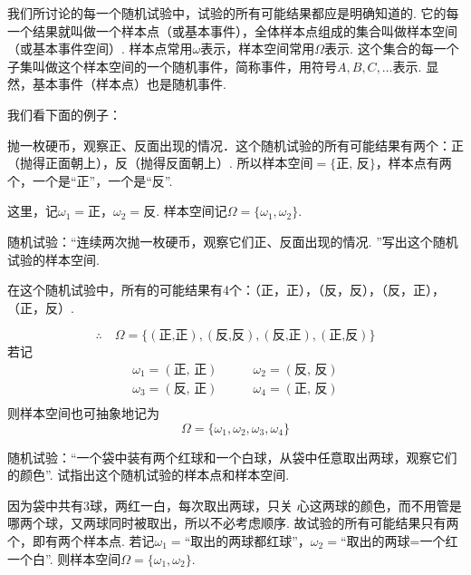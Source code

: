 我们所讨论的每一个随机试验中，试验的所有可能结果都应是明确知道的. 它的每一个结果就叫做一个样本点（或基本事件），全体样本点组成的集合叫做样本空间（或基本事件空间）. 样本点常用$\omega$表示，样本空间常用$\Omega$表示. 这个集合的每一个子集叫做这个样本空间的一个随机事件，简称事件，用符号$A,B,C,\ldots$表示. 显然，基本事件（样本点）也是随机事件. 

我们看下面的例子：

\begin{example}
    抛一枚硬币，观察正、反面出现的情况．这个随机试验的所有可能结果有两个：正（抛得正面朝上），反（抛得反面朝上）. 所以样本空间$=\{\text{正, 反}\}$，样本点有两个，一个是“正”，一个是“反”. 

这里，记$\omega_1=\text{正}$，$\omega_2=\text{反}$. 样本空间记$\Omega=\{\omega_1,\omega_2\}$. 
\end{example}
  
\begin{example}
    随机试验：“连续两次抛一枚硬币，观察它们正、反面出现的情况. ”写出这个随机试验的样本空间. 
\end{example}

\begin{solution}
    在这个随机试验中，所有的可能结果有4个：（正，正），（反，反），（反，正），（正，反）. 
    
\[\therefore\quad \Omega=\{(\text{正,正}), (\text{反,反}), (\text{反,正}), (\text{正,反})\}\]
若记
\[\begin{split}
    \omega_1=(\text{正, 正})&\qquad \omega_2=(\text{反, 反})\\
    \omega_3=(\text{反, 正})&\qquad \omega_4=(\text{正, 反})\\
\end{split}\]
则样本空间也可抽象地记为
\[\Omega =\{\omega_1,\omega_2,\omega_3,\omega_4\}\]
\end{solution}

\begin{example}
    随机试验：“一个袋中装有两个红球和一个白球，从袋中任意取出两球，观察它们的颜色”. 试指出这个随机试验的样本点和样本空间. 
\end{example}

\begin{solution}
因为袋中共有3球，两红一白，每次取出两球，只关
  心这两球的颜色，而不用管是哪两个球，又两球同时被取出，所以不必考虑顺序. 故试验的所有可能结果只有两个，即有两个样本点. 若记$\omega_1=$“取出的两球都红球”，$\omega_2=$“取出的两球=一个红一个白”. 则样本空间$\Omega=\{\omega_1,\omega_2\}$. 
\end{solution}

